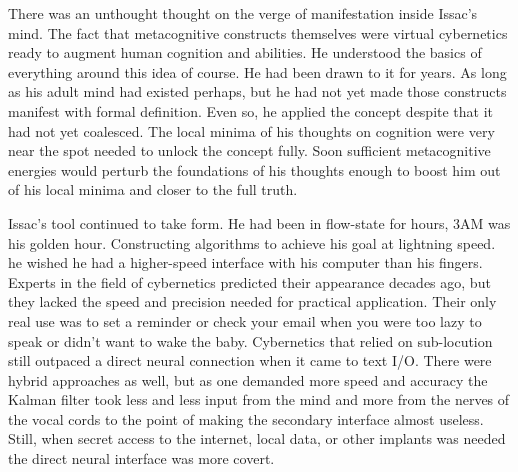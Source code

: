 There was an unthought thought on the verge of manifestation inside Issac's mind. The fact that metacognitive constructs themselves were virtual cybernetics ready to augment human cognition and abilities. He understood the basics of everything around this idea of course. He had been drawn to it for years. As long as his adult mind had existed perhaps, but he had not yet made those constructs manifest with formal definition. Even so, he applied the concept despite that it had not yet coalesced. The local minima of his thoughts on cognition were very near the spot needed to unlock the concept fully. Soon sufficient metacognitive energies would perturb the foundations of his thoughts enough to boost him out of his local minima and closer to the full truth.

Issac's tool continued to take form. He had been in flow\hyp{}state for hours, 3AM was his golden hour. Constructing algorithms to achieve his goal at lightning speed. he wished he had a higher\hyp{}speed interface with his computer than his fingers. Experts in the field of cybernetics predicted their appearance decades ago, but they lacked the speed and precision needed for practical application. Their only real use was to set a reminder or check your email when you were too lazy to speak or didn't want to wake the baby. Cybernetics that relied on sub\hyp{}locution still outpaced a direct neural connection when it came to text I/O. There were hybrid approaches as well, but as one demanded more speed and accuracy the Kalman filter took less and less input from the mind and more from the nerves of the vocal cords to the point of making the secondary interface almost useless. Still, when secret access to the internet, local data, or other implants was needed the direct neural interface was more covert.

